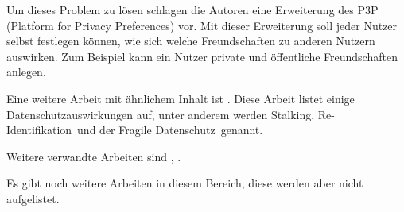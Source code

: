 Um dieses Problem zu lösen schlagen die Autoren eine Erweiterung des P3P (Platform for Privacy Preferences) vor. Mit dieser Erweiterung soll jeder Nutzer selbst festlegen können, wie sich welche Freundschaften zu anderen Nutzern auswirken. Zum Beispiel kann ein Nutzer private und öffentliche Freundschaften anlegen.


Eine weitere Arbeit mit ähnlichem Inhalt ist \citet{gross2005information}. Diese Arbeit listet einige Datenschutzauswirkungen auf, unter anderem werden \glqq Stalking\grqq , \glqq Re-Identifikation\grqq\ und der \glqq Fragile Datenschutz\grqq\ genannt.


Weitere verwandte Arbeiten sind \citet{hintz2014AGB}, \citet{mahmood2011privacy}.

Es gibt noch weitere Arbeiten in diesem Bereich, diese werden aber nicht aufgelistet.